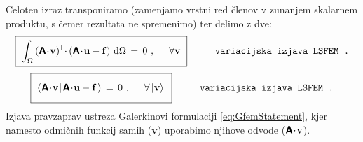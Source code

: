 Celoten izraz transponiramo (zamenjamo vrstni red členov v zunanjem skalarnem produktu, s čemer rezultata ne spremenimo) ter delimo z dve:
\begin{equation}
	\boxed{\
		\int_{\Omega} \, (\mathbsf{A} \! \cdot \! \mathbf{v})^\mathsf{\mkern-1mu T} \mkern-4.5mu \cdot \mkern-1mu (\mathbsf{A} \! \cdot \! \mathbf{u} - \mathbf{f}) \ \ud \Omega \, = \,
		0 \ , \hspace{5mm} \forall \mathbf{v} \vphantom{\bigg{)}} \
	}
	\hspace{10mm} \texttt{variacijska izjava LSFEM .}
	\label{eq:LsfemVariationalStatement}
\end{equation}
\begin{equation}
	\boxed{\
		\bra{\mkern1mu \mathbsf{A} \! \cdot \! \mathbf{v} \mkern1mu}\ket{\mkern2mu \mathbsf{A} \! \cdot \! \mathbf{u} - \mathbf{f} \mkern2mu} \, = \,
		0 \ , \hspace{5mm} \forall \ket{\mathbf{v}} \vphantom{\bigg{)}} \
	}
	\hspace{10mm} \texttt{variacijska izjava LSFEM .}
	\label{eq:LsfemVariationalStatement}
\end{equation}
Izjava pravzaprav ustreza Galerkinovi formulaciji \eqref{eq:GfemStatement}, kjer namesto odmičnih funkcij samih ($\mathbf{v}$) uporabimo njihove odvode ($\bm{\mathsf{A}} \! \cdot \! \mathbf{v}$).